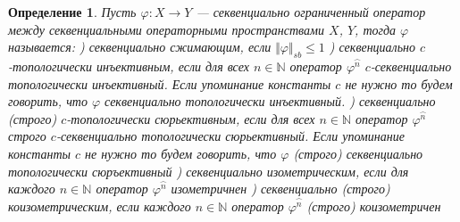 \documentclass[12pt]{article}
\newtheorem{definition}[theorem]{Определение}
\begin{document}
\begin{definition}\label{DefSBOpType}
Пусть $\varphi:X\to Y$ --- секвенциально ограниченный оператор между секвенциальными операторными пространствами $X$, $Y$, тогда $\varphi$ называется:
) \textit{секвенциально сжимающим}, если $\Vert \varphi\Vert_{sb}\leq 1$
) \textit{секвенциально $c$-топологически инъективным}, если для всех $n \in \mathbb{N}$ оператор $\varphi^{\wideparen{n}}$ $c$-секвенциально топологически инъективный. Если упоминание константы $c$ не нужно то 
будем говорить, что $\varphi$ секвенциально топологически инъективный.
) \textit{секвенциально (строго) $c$-топологически сюрьективным}, если для всех $n \in \mathbb{N}$ оператор $\varphi^{\wideparen{n}}$ строго $c$-секвенциально топологически сюрьективный. Если упоминание константы 
$c$ не нужно то будем говорить, что $\varphi$ (строго) секвенциально топологически сюръективный
) \textit{секвенциально изометрическим}, если для каждого $n\in\mathbb{N}$ оператор $\varphi^{\wideparen{n}}$ изометричнен
) \textit{секвенциально (строго) коизометрическим}, если каждого $n\in\mathbb{N}$ оператор $\varphi^{\wideparen{n}}$ (строго) коизометричен
\end{definition}
\end{document}
